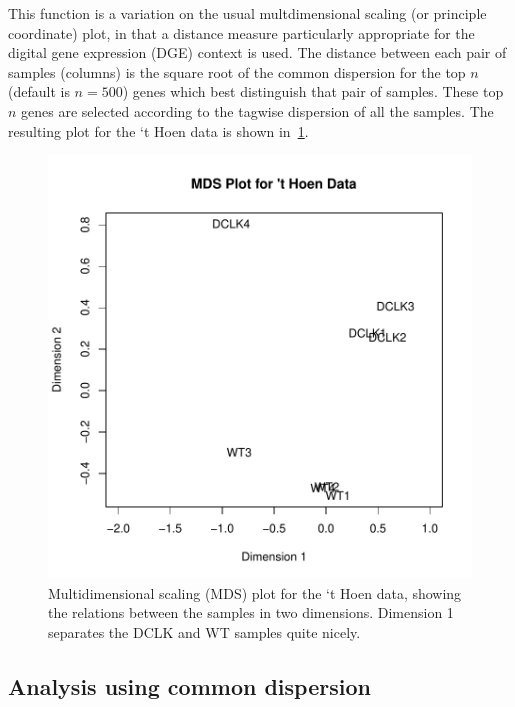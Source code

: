 This function is a variation on the usual multdimensional scaling (or
principle coordinate) plot, in that a distance measure particularly
appropriate for the digital gene expression (DGE) context is used. The
distance between each pair of samples (columns) is the square root of
the common dispersion for the top $n$ (default is $n = 500$) genes
which best distinguish that pair of samples. These top $n$ genes are
selected according to the tagwise dispersion of all the samples. The
resulting plot for the `t Hoen data is shown
in~\ref{fig:tHoen_MDS}. 

\begin{figure}[ht]
\begin{center}
\includegraphics[height=0.45\textheight]{edgeR_case_study_longSAGE_MDSplot.pdf}
\caption{Multidimensional scaling (MDS) plot for the `t Hoen data,
  showing the relations between the samples in two
  dimensions. Dimension 1 separates the DCLK and WT samples quite nicely.}
\label{fig:tHoen_MDS}
\end{center}
\end{figure}



\subsection{Analysis using common dispersion}
